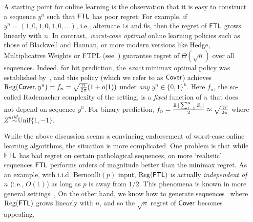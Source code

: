 A starting point for online learning is the observation that it is easy to construct a sequence $y^n$ such that $\mathsf{FTL}$ has poor regret: For example, if $y^n = (1,0,1,0,1,0,\ldots)$, i.e., alternate $1$s and $0$s, then the regret of $\mathsf{FTL}$ grows linearly with $n$. In contrast,~\emph{worst-case optimal} online learning policies such as those of Blackwell and Hannan, or more modern versions like Hedge, Multiplicative Weights or FTPL (see~\cite{Cesa-Bianchi--Lugosi2006,slivkins2019introduction}) guarantee regret of $\Theta(\sqrt{n})$ over all sequences. Indeed, for bit prediction, the \emph{exact} minimax optimal policy was established by~\cite{Cover1966}, and this policy (which we refer to as $\mathsf{Cover}$) achieves  $\mathrm{Reg}(\mathsf{Cover}, y^n) = f_n = \sqrt{\frac{n}{2\pi}}(1+o(1))$ under \emph{any} $y^n \in\{0,1\}^n$. Here $f_n$, the so-called Rademacher complexity of the setting, is a \emph{fixed} function of $n$ that does not depend on sequence $y^n$. For binary prediction, $f_n = \frac{\operatorname{\mathbb{E}}|\sum_{t=1}^n Z_t|}{2} \approx \sqrt{\frac{n}{2\pi}}$ where $Z^n \overset{iid}{\sim} \mathrm{Unif}\{1,-1\}$.

While the above discussion seems a convincing endorsement of worst-case online learning algorithms, the situation is more complicated. One problem is that while $\mathsf{FTL}$ has bad regret on certain pathological sequences, on more `realistic' sequences $\mathsf{FTL}$ performs orders of magnitude better than the minimax regret. As an example, with i.i.d. Bernoulli$(p)$ input, $\mathrm{Reg}(\mathsf{FTL})$ is actually \emph{independent of $n$} (i.e., $O(1)$) as long as $p$ is away from $1/2$. 
This phenomena is known in more general settings~\citep{Huang--Lattimore--Gyorgy--Szapesvari2016}, 
 On the other hand, 
we know how to generate sequences~\citep{feder1992universal} where $\mathrm{Reg}(\mathsf{FTL})$ grows linearly with $n$, and so the $\sqrt{n}$ regret of $\mathsf{Cover}$ becomes appealing. 

